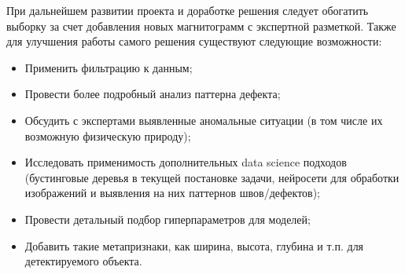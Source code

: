 \documentclass[a4paper,article,14pt]{extarticle}
\begin{document}
При дальнейшем развитии проекта и доработке решения следует обогатить выборку за счет добавления новых магнитограмм 
с экспертной разметкой. Также для улучшения работы самого решения существуют следующие возможности:

\begin{itemize}
    \item Применить фильтрацию к данным;
    \item Провести более подробный анализ паттерна дефекта;
    \item Обсудить с экспертами выявленные аномальные ситуации (в том числе их возможную физическую природу);
    \item Исследовать применимость дополнительных data science подходов \\(бустинговые деревья в текущей постановке задачи, нейросети для обработки изображений и выявления на них паттернов швов/дефектов);
    \item Провести детальный подбор гиперпараметров для моделей;
    \item Добавить такие метапризнаки, как ширина, высота, глубина и т.п. для детектируемого объекта.
\end{itemize}
\pagebreak
\end{document}
